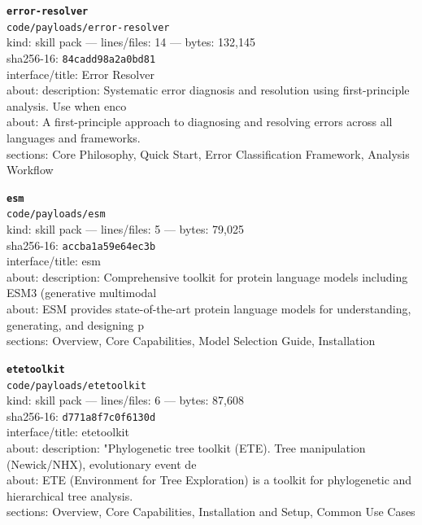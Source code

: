 \noindent\textbf{\texttt{error-resolver}}\\
\texttt{code/payloads/error-resolver}\\
kind: skill pack --- lines/files: 14 --- bytes: 132,145\\
sha256-16: \texttt{84cadd98a2a0bd81}\\
interface/title: Error Resolver\\
about: description: Systematic error diagnosis and resolution using first-principle analysis. Use when enco\\
about: A first-principle approach to diagnosing and resolving errors across all languages and frameworks.\\
sections: Core Philosophy, Quick Start, Error Classification Framework, Analysis Workflow\\
\vspace*{6.0pt}

\noindent\textbf{\texttt{esm}}\\
\texttt{code/payloads/esm}\\
kind: skill pack --- lines/files: 5 --- bytes: 79,025\\
sha256-16: \texttt{accba1a59e64ec3b}\\
interface/title: esm\\
about: description: Comprehensive toolkit for protein language models including ESM3 (generative multimodal\\
about: ESM provides state-of-the-art protein language models for understanding, generating, and designing p\\
sections: Overview, Core Capabilities, Model Selection Guide, Installation\\
\vspace*{6.0pt}
\newpage

\noindent\textbf{\texttt{etetoolkit}}\\
\texttt{code/payloads/etetoolkit}\\
kind: skill pack --- lines/files: 6 --- bytes: 87,608\\
sha256-16: \texttt{d771a8f7c0f6130d}\\
interface/title: etetoolkit\\
about: description: "Phylogenetic tree toolkit (ETE). Tree manipulation (Newick/NHX), evolutionary event de\\
about: ETE (Environment for Tree Exploration) is a toolkit for phylogenetic and hierarchical tree analysis.\\
sections: Overview, Core Capabilities, Installation and Setup, Common Use Cases\\
\vspace*{6.0pt}

